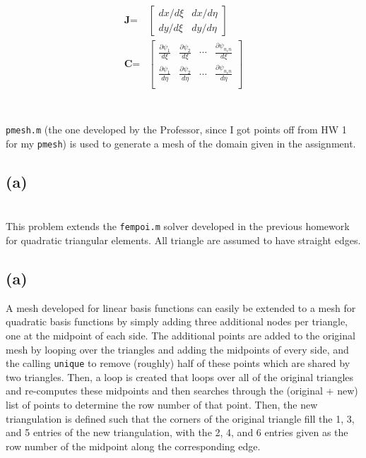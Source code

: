 \documentclass[10pt]{article}
\newcommand{\beqa}{\begin{equation}\begin{aligned}}
\newcommand{\eeqa}{\end{aligned}\end{equation}}
\begin{document}
\beqa
\textbf{J}=&\begin{bmatrix}dx/d\xi & dx/d\eta\\ dy/d\xi & dy/d\eta\end{bmatrix}\\
\textbf{C}=&\begin{bmatrix}
\frac{\partial\psi_1}{d\xi} & \frac{\partial\psi_2}{d\xi} & \cdots & \frac{\partial\psi_{n_en}}{d\xi}\\
\frac{\partial\psi_1}{d\eta} & \frac{\partial\psi_2}{d\eta} & \cdots & \frac{\partial\psi_{n_en}}{d\eta}\\
\end{bmatrix}\\ 
\eeqa





\section{}

{\tt pmesh.m} (the one developed by the Professor, since I got points off from HW 1 for my {\tt pmesh}) is used to generate a mesh of the domain given in the assignment. 

\subsection{(a)}


\section{}

This problem extends the {\tt fempoi.m} solver developed in the previous homework for quadratic triangular elements. All triangle are assumed to have straight edges. 

\subsection{(a)}

A mesh developed for linear basis functions can easily be extended to a mesh for quadratic basis functions by simply adding three additional nodes per triangle, one at the midpoint of each side. The additional points are added to the original mesh by looping over the triangles and adding the midpoints of every side, and the calling {\tt unique} to remove (roughly) half of these points which are shared by two triangles. Then, a loop is created that loops over all of the original triangles and re-computes these midpoints and then searches through the (original + new) list of points to determine the row number of that point. Then, the new triangulation is defined such that the corners of the original triangle fill the 1, 3, and 5 entries of the new triangulation, with the 2, 4, and 6 entries given as the row number of the midpoint along the corresponding edge.
\end{document}
